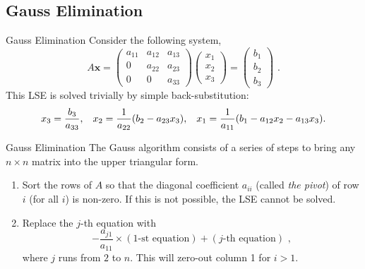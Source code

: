 \documentclass[11pt]{beamer}
\begin{document}
\subsection{Gauss Elimination}
\begin{frame}[fragile]{ Gauss Elimination}
Consider the following system,
\begin{equation}
A\mathbf{x} = \begin{pmatrix}
a_{11}&a_{12}&a_{13}\\
0 &a_{22}&a_{23}\\
0 &0 &a_{33} \end{pmatrix}\begin{pmatrix}x_1\\x_2\\x_3\end{pmatrix}
= \begin{pmatrix}b_1\\b_2\\b_3\end{pmatrix}\,\,.
\end{equation}
This LSE is solved trivially by simple back-substitution:
\begin{equation}
x_3 = \frac{b_3}{a_{33}},\hspace{0.3cm}x_2 = \frac{1}{a_{22}}(b_2 - a_{23} x_3), \hspace{0.3cm} x_1 = \frac{1}{a_{11}} ( b_1 - a_{12} x_2 - a_{13} x_3).
\end{equation}
\end{frame}

\begin{frame}[fragile]{Gauss Elimination}
The Gauss algorithm consists of a series of steps to bring any $n \times n$
matrix into the  upper triangular form.

\begin{enumerate}
\item Sort the rows of $A$ so that the diagonal coefficient $a_{ii}$
  (called \emph{the pivot}) of row $i$ (for all $i$) is non-zero. If this
  is not possible, the LSE cannot be solved.
\item Replace the $j$-th equation with
\begin{equation}
-\frac{a_{j1}}{a_{11}} \times (\text{1-st equation}) + (j\text{-th equation})\,\,,
\end{equation}
where $j$ runs from $2$ to $n$. This will zero-out column 1 for $i>1$.
\end{enumerate}

\end{frame}
\end{document}
